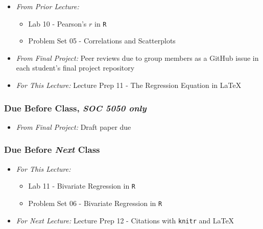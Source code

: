 \documentclass[]{book}
\providecommand{\tightlist}{%
  \setlength{\itemsep}{0pt}\setlength{\parskip}{0pt}}
\theoremstyle{definition}
\theoremstyle{definition}
\theoremstyle{definition}
\theoremstyle{remark}
\begin{document}
\begin{itemize}
\tightlist
\item
  \emph{From Prior Lecture:}

  \begin{itemize}
  \tightlist
  \item
    Lab 10 - Pearson's \(r\) in \texttt{R}
  \item
    Problem Set 05 - Correlations and Scatterplots
  \end{itemize}
\item
  \emph{From Final Project:} Peer reviews due to group members as a
  GitHub issue in each student's final project repository
\item
  \emph{For This Lecture:} Lecture Prep 11 - The Regression Equation in
  LaTeX
\end{itemize}

\hypertarget{due-before-class-soc-5050-only-1}{%
\subsubsection*{\texorpdfstring{Due Before Class, \emph{SOC 5050
only}}{Due Before Class, SOC 5050 only}}\label{due-before-class-soc-5050-only-1}}

\begin{itemize}
\tightlist
\item
  \emph{From Final Project:} Draft paper due
\end{itemize}

\hypertarget{due-before-next-class-11}{%
\subsubsection*{\texorpdfstring{Due Before \emph{Next}
Class}{Due Before Next Class}}\label{due-before-next-class-11}}

\begin{itemize}
\tightlist
\item
  \emph{For This Lecture:}

  \begin{itemize}
  \tightlist
  \item
    Lab 11 - Bivariate Regression in \texttt{R}
  \item
    Problem Set 06 - Bivariate Regression in \texttt{R}
  \end{itemize}
\item
  \emph{For Next Lecture:} Lecture Prep 12 - Citations with
  \texttt{knitr} and LaTeX
\end{itemize}
\end{document}
